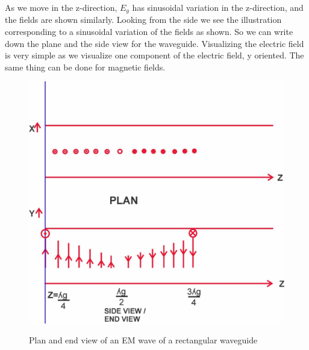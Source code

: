 As we move in the z-direction, $E_{y}$ has sinusoidal variation in the z-direction, and the fields are shown similarly. Looking from the side we see the illustration corresponding to a sinusoidal variation of the fields as shown. So we can write down the plane and the side view for the waveguide. Visualizing the electric field is very simple as we visualize one component of the electric field, y oriented. The same thing can be done for magnetic fields.
\begin{figure}[h]
\centering
\includegraphics[width=1\linewidth]{./graphics/lecture-image-3.jpg}
\label{fig:lectureimage3}
\caption{Plan and end view of an EM wave of a rectangular waveguide}
\end{figure}

